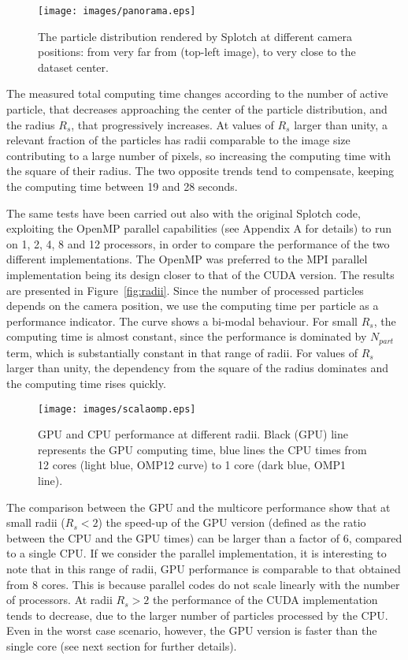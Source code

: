 \documentclass[1p]{elsarticle}
\begin{document}
\begin{figure}
\centering
\texttt{[image: images/panorama.eps]}
\caption{The particle distribution rendered by Splotch at different camera positions: from very 
far from (top-left image), to very close to the dataset center.}
\label{fig:panorama}
\end{figure}

The measured total computing time changes according
to the number of active particle, that decreases approaching the center of the particle 
distribution, and the radius $R_s$, that progressively increases. At values of 
$R_s$ larger than unity, a relevant fraction of the particles has radii comparable to the image size
contributing to a large number of pixels, so increasing the computing time 
with the square of their radius. The two opposite trends tend to compensate, keeping  
the computing time between 19 and 28 seconds.

The same tests have been carried out also with the original Splotch code, exploiting the OpenMP parallel capabilities (see Appendix A for details) to run on 1, 2, 4, 8 and 12 processors, in order 
to compare the performance of the two different implementations. The OpenMP was preferred to the MPI parallel implementation being its design closer to that of the CUDA version. The results are presented in Figure~\ref{fig:radii}. 
Since the number of processed particles depends on
the camera position, we use the  
computing time per particle as a performance
indicator. The curve shows a bi-modal behaviour. For small $R_s$,
the computing time is almost constant, since the performance is dominated
by $N_{part}$ term, which is substantially constant in that range of 
radii. For values of $R_s$ larger 
than unity, the dependency from the square of the radius dominates and the computing time 
rises quickly. 

\begin{figure}
\centering
\texttt{[image: images/scalaomp.eps]}
\caption{GPU and CPU performance at different radii. Black (GPU) line represents the GPU 
computing time, blue lines the CPU times from 12 cores (light blue, OMP12 curve) to 1 core
(dark blue, OMP1 line).}
\label{fig:gpucpu}
\end{figure}

The comparison between the GPU and the multicore performance show that 
at small radii ($R_s < 2$) the speed-up of the GPU version (defined as the ratio between the CPU and the GPU times) can be larger than a factor of 6, compared to a single CPU. If we consider the parallel implementation, it is interesting to note that in this range of radii, GPU performance is comparable to that obtained from 8 cores. This is because parallel codes do not scale linearly with the number of processors. At radii $R_s > 2$ the performance of the CUDA implementation tends to decrease, due to the larger number of particles processed by the CPU. Even in the worst case scenario, however, the GPU version is faster than the single core (see next section for further details). 
\end{document}
